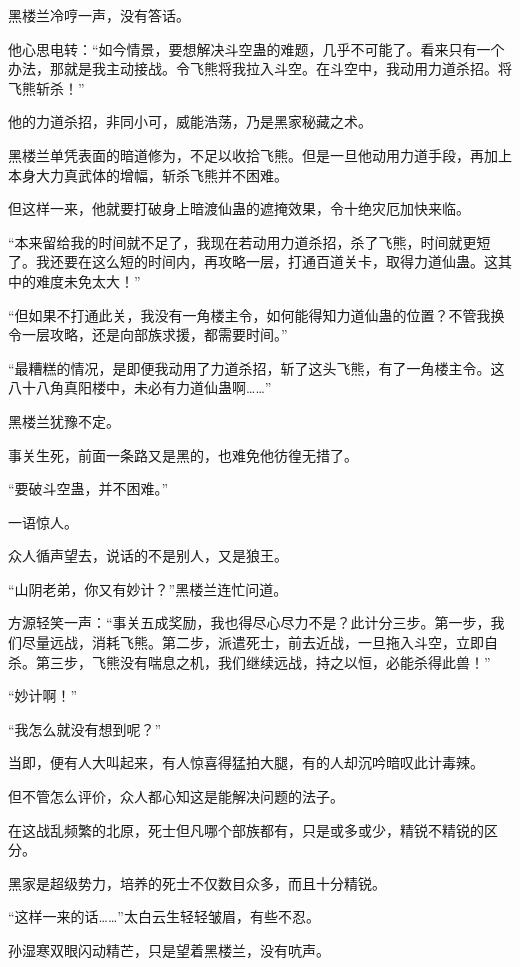 \begin{this_body}
黑楼兰冷哼一声，没有答话。

他心思电转：“如今情景，要想解决斗空蛊的难题，几乎不可能了。看来只有一个办法，那就是我主动接战。令飞熊将我拉入斗空。在斗空中，我动用力道杀招。将飞熊斩杀！”

他的力道杀招，非同小可，威能浩荡，乃是黑家秘藏之术。

黑楼兰单凭表面的暗道修为，不足以收拾飞熊。但是一旦他动用力道手段，再加上本身大力真武体的增幅，斩杀飞熊并不困难。

但这样一来，他就要打破身上暗渡仙蛊的遮掩效果，令十绝灾厄加快来临。

“本来留给我的时间就不足了，我现在若动用力道杀招，杀了飞熊，时间就更短了。我还要在这么短的时间内，再攻略一层，打通百道关卡，取得力道仙蛊。这其中的难度未免太大！”

“但如果不打通此关，我没有一角楼主令，如何能得知力道仙蛊的位置？不管我换令一层攻略，还是向部族求援，都需要时间。”

“最糟糕的情况，是即便我动用了力道杀招，斩了这头飞熊，有了一角楼主令。这八十八角真阳楼中，未必有力道仙蛊啊……”

黑楼兰犹豫不定。

事关生死，前面一条路又是黑的，也难免他彷徨无措了。

“要破斗空蛊，并不困难。”

一语惊人。

众人循声望去，说话的不是别人，又是狼王。

“山阴老弟，你又有妙计？”黑楼兰连忙问道。

方源轻笑一声：“事关五成奖励，我也得尽心尽力不是？此计分三步。第一步，我们尽量远战，消耗飞熊。第二步，派遣死士，前去近战，一旦拖入斗空，立即自杀。第三步，飞熊没有喘息之机，我们继续远战，持之以恒，必能杀得此兽！”

“妙计啊！”

“我怎么就没有想到呢？”

当即，便有人大叫起来，有人惊喜得猛拍大腿，有的人却沉吟暗叹此计毒辣。

但不管怎么评价，众人都心知这是能解决问题的法子。

在这战乱频繁的北原，死士但凡哪个部族都有，只是或多或少，精锐不精锐的区分。

黑家是超级势力，培养的死士不仅数目众多，而且十分精锐。

“这样一来的话……”太白云生轻轻皱眉，有些不忍。

孙湿寒双眼闪动精芒，只是望着黑楼兰，没有吭声。


\end{this_body}
